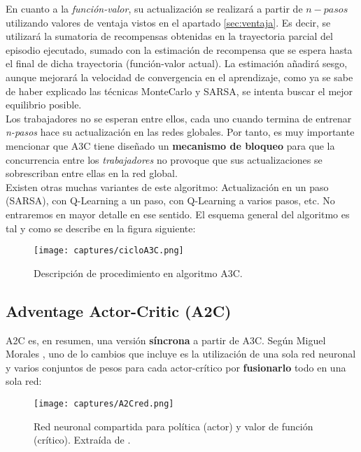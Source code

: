 \documentclass[11pt,fleqn]{book} %
\begin{document}
En cuanto a la \textit{función-valor}, su actualización se realizará a partir de $n-pasos$ utilizando valores de ventaja vistos en el apartado \ref{sec:ventaja}. Es decir, se utilizará la sumatoria de recompensas obtenidas en la trayectoria parcial del episodio ejecutado, sumado con la estimación de recompensa que se espera hasta el final de dicha trayectoria (función-valor actual). La estimación añadirá sesgo, aunque mejorará la velocidad de convergencia en el aprendizaje, como ya se sabe de haber explicado las técnicas MonteCarlo y SARSA, se intenta buscar el mejor equilibrio posible.\\

Los trabajadores no se esperan entre ellos, cada uno cuando termina de entrenar \textit{n-pasos} hace su actualización en las redes globales. Por tanto, es muy importante mencionar que A3C tiene diseñado un \textbf{mecanismo de bloqueo} para que la concurrencia entre los \textit{trabajadores} no provoque que sus actualizaciones se sobrescriban entre ellas en la red global. \\

Existen otras muchas variantes de este algoritmo: Actualización en un paso (SARSA), con Q-Learning a un paso, con Q-Learning a varios pasos, etc. No entraremos en mayor detalle en ese sentido. El esquema general del algoritmo es tal y como se describe en la figura siguiente: \\

\begin{figure}[H]
	\centering\texttt{[image: captures/cicloA3C.png]}
	\caption{Descripción de procedimiento en algoritmo A3C.}
	\label{fig:cicloA3C} %
\end{figure}

\subsection{Adventage Actor-Critic (A2C)}

A2C \cite{article:A2C} es, en resumen, una versión \textbf{síncrona} a partir de A3C. Según Miguel Morales \cite{book:miguel}, uno de lo cambios que incluye es la utilización de una sola red neuronal y varios conjuntos de pesos para cada actor-crítico por \textbf{fusionarlo} todo en una sola red:

\begin{figure}[H]
	\centering\texttt{[image: captures/A2Cred.png]}
	\caption{Red neuronal compartida para política (actor) y valor de función (crítico). Extraída de \cite{book:miguel}.}
	\label{fig:A2Cred} %
\end{figure}
\end{document}
